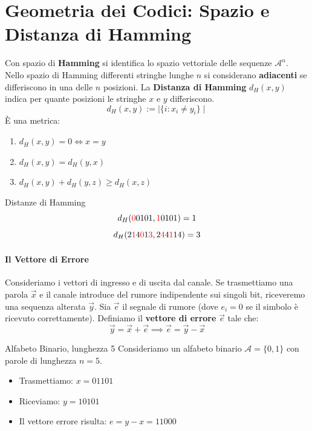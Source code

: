 \section{Geometria dei Codici: Spazio e Distanza  di Hamming}
Con spazio di \textbf{Hamming} si identifica lo spazio vettoriale delle sequenze $\mathcal{A}^n$. Nello spazio di Hamming differenti stringhe lunghe $n$ si considerano \textbf{adiacenti} se differiscono in una delle $n$ posizioni.
La \textbf{Distanza di Hamming} $d_H(x,y)$ indica per quante posizioni le stringhe $x$ e $y$ differiscono.
\[d_H(x,y) := \mid \{i:x_i\neq y_i\}\mid\]
È una metrica:
\begin{enumerate}
\item $d_H(x,y)=0 \iff x = y$
\item $d_H(x,y)=d_H(y,x)$
\item $d_H(x,y)+d_H(y,z) \geq d_H(x,z)$
\end{enumerate}

\begin{esempio}{Distanze di Hamming}
\[d_H(\textcolor{red}{0}0101,\textcolor{red}{1}0101)=1\]
\[d_H(2\textcolor{red}{1}4\textcolor{red}{0}1\textcolor{red}{3},2\textcolor{red}{4}4\textcolor{red}{1}14)=3\]
\end{esempio}

\paragraph{Il Vettore di Errore}
Consideriamo i vettori di ingresso e di uscita dal canale. Se trasmettiamo una parola $\vec{x}$ e il canale introduce del rumore indipendente sui singoli bit, riceveremo una sequenza alterata $\vec{y}$.
Sia $\vec{e}$ il segnale di rumore (dove $e_i=0$ se il simbolo è ricevuto correttamente). Definiamo il \textbf{vettore di errore} $\vec{e}$ tale che:
\[ \vec{y} = \vec{x} + \vec{e} \implies \vec{e} = \vec{y} - \vec{x} \]

\begin{esempio}{Alfabeto Binario, lunghezza 5}
Consideriamo un alfabeto binario $\mathcal{A}=\{0,1\}$ con parole di lunghezza $n=5$.
\begin{itemize}
    \item Trasmettiamo: $x = 01101$
    \item Riceviamo: $y = 10101$
    \item Il vettore errore risulta: $e = y - x = 11000$
\end{itemize}
\end{esempio}

